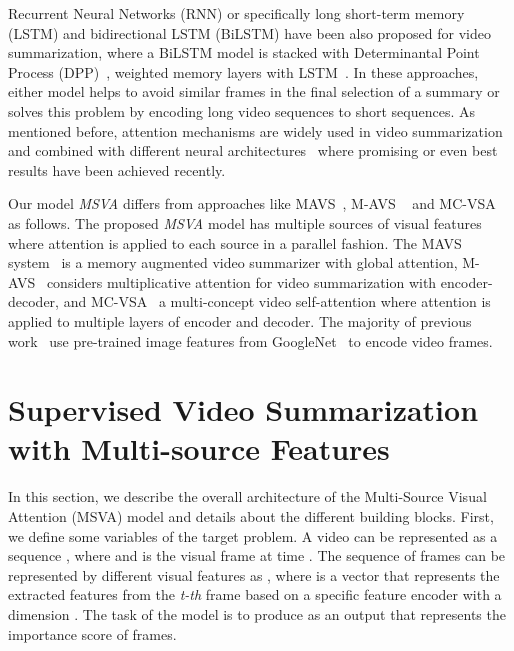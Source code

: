 \documentclass{article}
\begin{document}
Recurrent Neural Networks (RNN) or specifically long short-term memory (LSTM) and bidirectional LSTM (BiLSTM) have been also proposed for video summarization, where a BiLSTM model is stacked with Determinantal Point Process (DPP)~\cite{DBLP:conf/eccv/ZhangCSG16}, weighted memory layers with LSTM~\cite{DBLP:conf/eccv/ZhangGS18}.
In these approaches, either model helps to avoid similar frames in the final selection of a summary or solves this problem by encoding long video sequences to short sequences. As mentioned before, attention mechanisms are widely used in video summarization and combined with different neural architectures~\cite{DBLP:journals/corr/abs-2006-01410, DBLP:conf/accv/FajtlSAMR18,DBLP:journals/corr/abs-1708-09545,DBLP:conf/wacv/FuTC19} where promising or even best results have been achieved recently.

Our model \emph{MSVA} differs from approaches like MAVS~\cite{DBLP:conf/mm/FengLKZ18}, M-AVS ~\cite{DBLP:journals/corr/abs-1708-09545} and MC-VSA ~\cite{DBLP:journals/corr/abs-2006-01410} as follows. The proposed \emph{MSVA} model has multiple sources of visual features where attention is applied to each source in a parallel fashion. The MAVS system~\cite{DBLP:conf/mm/FengLKZ18} is a memory augmented video summarizer with global attention, M-AVS~\cite{DBLP:journals/corr/abs-1708-09545} considers multiplicative attention for video summarization with encoder-decoder, and MC-VSA~\cite{DBLP:journals/corr/abs-2006-01410} a multi-concept video self-attention where attention is applied to multiple layers of encoder and decoder. 
The majority of previous work~\cite{DBLP:conf/eccv/ZhangCSG16, DBLP:conf/eccv/ZhangGS18, DBLP:journals/corr/abs-1708-09545} use pre-trained image features from GoogleNet~\cite{DBLP:conf/cvpr/SzegedyLJSRAEVR15} to encode video frames.




\section{Supervised Video Summarization with Multi-source Features}\label{sec:methodology}

In this section, we describe the overall architecture of the Multi-Source Visual Attention (MSVA) model and details about the different building blocks. 
First, we define some variables of the target problem. A video can be represented as a sequence , where  and  is the visual frame at time . 
The sequence  of frames can be represented by different visual features as , where  is a vector that represents the extracted features from the \emph{t-th} frame based on a specific feature encoder with a dimension . The task of the model is to produce  as an output that represents the importance score of frames.
																																																																																																																																																							  
\end{document}
